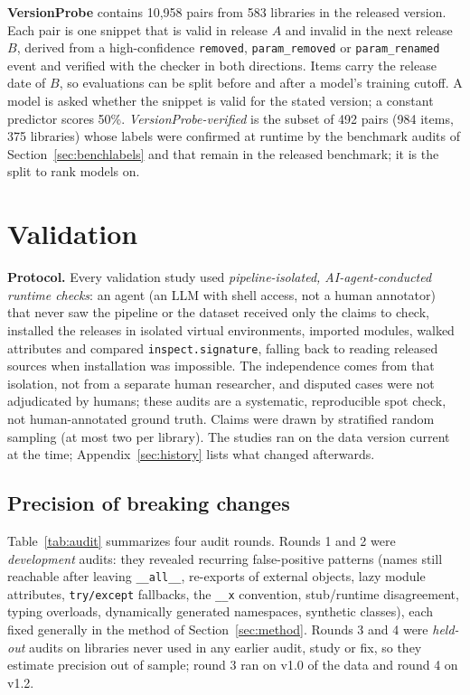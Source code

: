 \documentclass[10pt,twocolumn,letterpaper]{article}
\begin{document}
\textbf{VersionProbe} contains 10,958 pairs from 583 libraries in the released version. Each pair is one snippet
that is valid in release $A$ and invalid in the next release $B$, derived from a high-confidence
\texttt{removed}, \texttt{param\_removed} or \texttt{param\_renamed} event and verified with the checker in both
directions. Items carry the release date of $B$, so evaluations can be split before and after a model's training
cutoff. A model is asked whether the snippet is valid for the stated version; a constant predictor scores 50\%.
\emph{VersionProbe-verified} is the subset of 492 pairs (984 items, 375 libraries) whose
labels were confirmed at runtime by the benchmark audits of Section~\ref{sec:benchlabels} and that remain in the
released benchmark; it is the split to rank models on.

\section{Validation}\label{sec:validation}
\textbf{Protocol.} Every validation study used \emph{pipeline-isolated, AI-agent-conducted runtime checks}: an agent
(an LLM with shell access, not a human annotator) that never saw the pipeline or the dataset received only the claims
to check, installed the releases in isolated virtual environments, imported modules, walked attributes and compared
\texttt{inspect.signature}, falling back to reading released sources when installation was impossible. The
independence comes from that isolation, not from a separate human researcher, and disputed cases were not
adjudicated by humans; these audits are a systematic, reproducible spot check, not human-annotated ground truth.
Claims were drawn by stratified random sampling (at most two per library). The studies ran on the data version current
at the time; Appendix~\ref{sec:history} lists what changed afterwards.

\subsection{Precision of breaking changes}
Table~\ref{tab:audit} summarizes four audit rounds. Rounds 1 and 2 were \emph{development} audits: they revealed
recurring false-positive patterns (names still reachable after leaving \texttt{\_\_all\_\_}, re-exports of external
objects, lazy module attributes, \texttt{try/except} fallbacks, the \texttt{\_\_x} convention, stub/runtime
disagreement, typing overloads, dynamically generated namespaces, synthetic classes), each fixed generally in the
method of Section~\ref{sec:method}. Rounds 3 and 4 were \emph{held-out} audits on libraries never used in any earlier
audit, study or fix, so they estimate precision out of sample; round 3 ran on v1.0 of the data and round 4 on v1.2.
\end{document}

